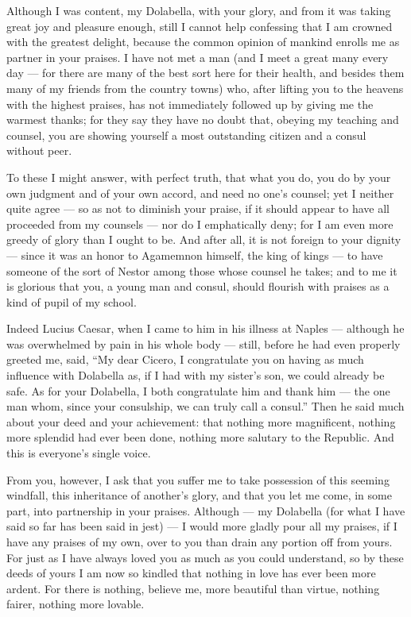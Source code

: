 

 Although I was content, my Dolabella, with your glory, and from it was taking great joy and pleasure enough, still I cannot help confessing that I am crowned with the greatest delight, because the common opinion of mankind enrolls me as partner in your praises. I have not met a man (and I meet a great many every day --- for there are many of the best sort here for their health, and besides them many of my friends from the country towns) who, after lifting you to the heavens with the highest praises, has not immediately followed up by giving me the warmest thanks; for they say they have no doubt that, obeying my teaching and counsel, you are showing yourself a most outstanding citizen and a consul without peer.

 To these I might answer, with perfect truth, that what you do, you do by your own judgment and of your own accord, and need no one's counsel; yet I neither quite agree --- so as not to diminish your praise, if it should appear to have all proceeded from my counsels --- nor do I emphatically deny; for I am even more greedy of glory than I ought to be. And after all, it is not foreign to your dignity --- since it was an honor to Agamemnon himself, the king of kings --- to have someone of the sort of Nestor among those whose counsel he takes; and to me it is glorious that you, a young man and consul, should flourish with praises as a kind of pupil of my school.

 Indeed Lucius Caesar, when I came to him in his illness at Naples --- although he was overwhelmed by pain in his whole body --- still, before he had even properly greeted me, said, ``My dear Cicero, I congratulate you on having as much influence with Dolabella as, if I had with my sister's son, we could already be safe. As for your Dolabella, I both congratulate him and thank him --- the one man whom, since your consulship, we can truly call a consul.'' Then he said much about your deed and your achievement: that nothing more magnificent, nothing more splendid had ever been done, nothing more salutary to the Republic. And this is everyone's single voice.

 From you, however, I ask that you suffer me to take possession of this seeming windfall, this inheritance of another's glory, and that you let me come, in some part, into partnership in your praises. Although --- my Dolabella (for what I have said so far has been said in jest) --- I would more gladly pour all my praises, if I have any praises of my own, over to you than drain any portion off from yours. For just as I have always loved you as much as you could understand, so by these deeds of yours I am now so kindled that nothing in love has ever been more ardent. For there is nothing, believe me, more beautiful than virtue, nothing fairer, nothing more lovable.

